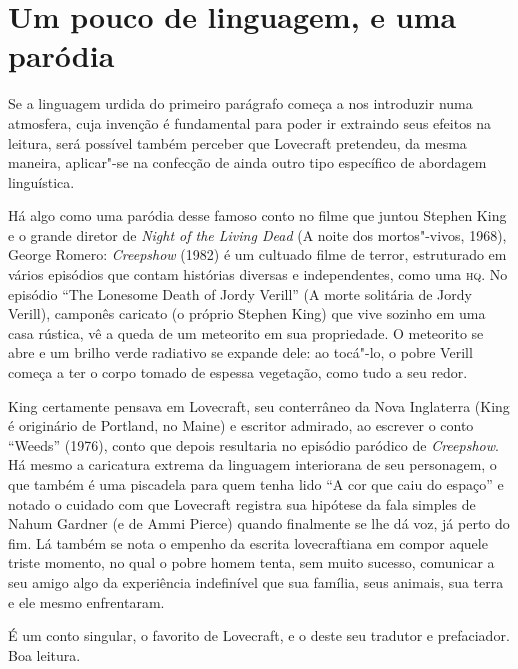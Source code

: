 \section*{Um pouco de linguagem, e uma paródia}

Se a linguagem urdida do primeiro parágrafo começa a nos introduzir numa
atmosfera, cuja invenção é fundamental para poder ir extraindo seus
efeitos na leitura, será possível também perceber que Lovecraft
pretendeu, da mesma maneira, aplicar"-se na confecção de ainda outro tipo
específico de abordagem linguística.

Há algo como uma paródia desse famoso conto no filme que juntou Stephen
King e o grande diretor de \emph{Night of the Living Dead} (A noite dos
mortos"-vivos, 1968), George Romero: \emph{Creepshow} (1982) é um
cultuado filme de terror, estruturado em vários episódios que contam
histórias diversas e independentes, como uma \textsc{hq}. No episódio ``The
Lonesome Death of Jordy Verill'' (A morte solitária de Jordy Verill),
camponês caricato (o próprio Stephen King) que vive sozinho em uma casa
rústica, vê a queda de um meteorito em sua propriedade. O meteorito se
abre e um brilho verde radiativo se expande dele: ao tocá"-lo, o pobre
Verill começa a ter o corpo tomado de espessa vegetação, como tudo a seu
redor.

King certamente pensava em Lovecraft, seu conterrâneo da Nova Inglaterra
(King é originário de Portland, no Maine) e escritor admirado, ao
escrever o conto ``Weeds'' (1976), conto que depois resultaria no
episódio paródico de \emph{Creepshow}. Há mesmo a caricatura extrema da
linguagem interiorana de seu personagem, o que também é uma piscadela
para quem tenha lido ``A cor que caiu do espaço'' e notado o cuidado com
que Lovecraft registra sua hipótese da fala simples de Nahum Gardner (e
de Ammi Pierce) quando finalmente se lhe dá voz, já perto do fim. Lá
também se nota o empenho da escrita lovecraftiana em compor aquele
triste momento, no qual o pobre homem tenta, sem muito sucesso,
comunicar a seu amigo algo da experiência indefinível que sua família,
seus animais, sua terra e ele mesmo enfrentaram.

É um conto singular, o favorito de Lovecraft, e o deste seu tradutor e
prefaciador. Boa leitura.

